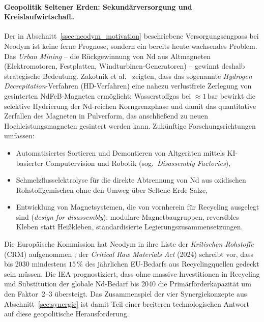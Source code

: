 ﻿\documentclass[12pt, a4paper]{report}
\theoremstyle{definition}
\theoremstyle{remark}
\begin{document}
\paragraph{Geopolitik Seltener Erden: Sekundärversorgung und Kreislaufwirtschaft.}
Der in Abschnitt~\ref{ssec:neodym_motivation} beschriebene Versorgungsengpass
bei Neodym ist keine ferne Prognose, sondern ein bereits heute wachsendes Problem.
Das \emph{Urban Mining} -- die Rückgewinnung von Nd aus Altmagneten
(Elektromotoren, Festplatten, Windturbinen-Generatoren) -- gewinnt deshalb
strategische Bedeutung. Zakotnik et al.~\cite{zakotnik2009} zeigten,
dass das sogenannte \emph{Hydrogen Decrepitation}-Verfahren (HD-Verfahren) eine
nahezu verlustfreie Zerlegung von gesinterten NdFeB-Magneten ermöglicht: Wasserstoffgas
bei $\approx 1\,\text{bar}$ bewirkt die selektive Hydrierung der Nd-reichen
Korngrenzphase und damit das quantitative Zerfallen des Magneten in Pulverform,
das anschließend zu neuen Hochleistungsmagneten gesintert werden kann. Zukünftige
Forschungsrichtungen umfassen:
\begin{itemize}
  \item Automatisiertes Sortieren und Demontieren von Altgeräten mittels
        KI-basierter Computervision und Robotik (sog.\ \emph{Disassembly Factories}),
  \item Schmelzflusselektrolyse für die direkte Abtrennung von Nd aus oxidischen
        Rohstoffgemischen ohne den Umweg über Seltene-Erde-Salze,
  \item Entwicklung von Magnetsystemen, die von vornherein für Recycling ausgelegt
        sind (\emph{design for disassembly}): modulare Magnetbaugruppen, reversibles
        Kleben statt Heißkleben, standardisierte Legierungszusammensetzungen.
\end{itemize}
Die Europäische Kommission hat Neodym in ihre Liste der \emph{Kritischen Rohstoffe}
(CRM) aufgenommen \cite{eu2023}; der \emph{Critical Raw Materials Act} (2024)
schreibt vor, dass bis 2030 mindestens $15\,\%$ des jährlichen EU-Bedarfs aus
Recyclingquellen gedeckt sein müssen. Die IEA \cite{iea2024} prognostiziert, dass
ohne massive Investitionen in Recycling und Substitution der globale Nd-Bedarf bis
2040 die Primärförderkapazität um den Faktor~2--3 übersteigt. Das Zusammenspiel der
vier Synergiekonzepte aus Abschnitt~\ref{sec:synergie} ist damit Teil einer
breiteren technologischen Antwort auf diese geopolitische Herausforderung.
\end{document}
